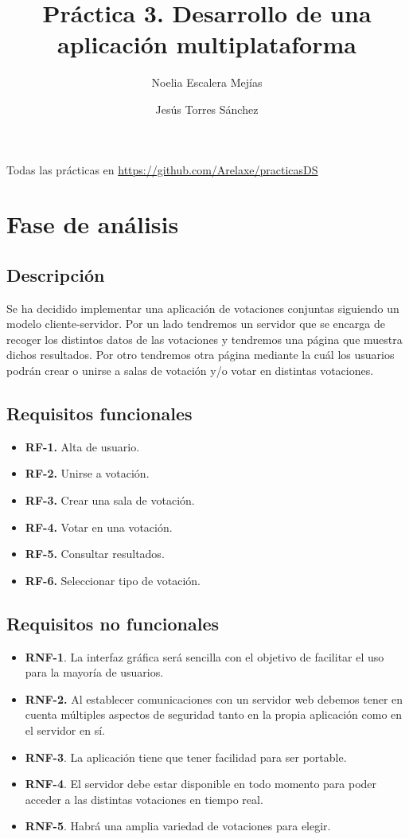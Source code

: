 \documentclass{article}
\title{Práctica 3. Desarrollo de una aplicación multiplataforma}
\author{Noelia Escalera Mejías \and Jesús Torres Sánchez}
\begin{document}
	\maketitle
	\tableofcontents
	\newpage
	Todas las prácticas en \href{https://github.com/Arelaxe/practicasDS}{https://github.com/Arelaxe/practicasDS}
	\section{Fase de análisis}
	\subsection{Descripción}
	Se ha decidido implementar una aplicación de votaciones conjuntas siguiendo un modelo cliente-servidor. Por un lado tendremos un servidor que se encarga de recoger los distintos datos de las votaciones y tendremos una página que muestra dichos resultados. Por otro tendremos otra página mediante la cuál los usuarios podrán crear o unirse a salas de votación y/o votar en distintas votaciones.
	
	\subsection{Requisitos funcionales}
	\begin{itemize}
		\item \textbf{RF-1.} Alta de usuario.
		\item \textbf{RF-2.} Unirse a votación.
		\item \textbf{RF-3.} Crear una sala de votación.
		\item \textbf{RF-4.} Votar en una votación.
		\item \textbf{RF-5.} Consultar resultados.
		\item \textbf{RF-6.} Seleccionar tipo de votación. \\
	\end{itemize}
	
	\subsection{Requisitos no funcionales}
	\begin{itemize}
		\item \textbf{RNF-1}. La interfaz gráfica será sencilla con el objetivo de facilitar el uso para la mayoría de usuarios.
		\item \textbf{RNF-2.} Al establecer comunicaciones con un servidor web debemos tener
		en cuenta múltiples aspectos de seguridad tanto en la propia aplicación
		como en el servidor en sí.
		\item \textbf{RNF-3}. La aplicación tiene que tener facilidad para ser portable.
		\item \textbf{RNF-4}. El servidor debe estar disponible en todo momento para poder
		acceder a las distintas votaciones en tiempo real.
		\item \textbf{RNF-5}. Habrá una amplia variedad de votaciones para elegir.
	\end{itemize}
\end{document}
